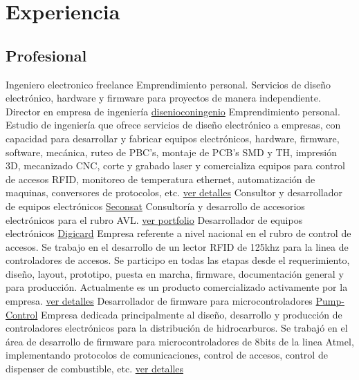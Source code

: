 \section{Experiencia}
   \subsection{Profesional}
       { Ingeniero electronico freelance}                   { } { } { } { Emprendimiento personal. Servicios de diseño electrónico, hardware y firmware para proyectos de manera independiente. }
           { Director en empresa de ingeniería}                 { \href { www.disenioconingenio.com.ar} { disenioconingenio}} { } { } { Emprendimiento personal. Estudio de ingeniería que ofrece servicios de diseño electrónico a empresas, con capacidad para desarrollar y fabricar equipos electrónicos, hardware, firmware, software, mecánica, ruteo de PBC's, montaje de PCB's SMD y TH, impresión 3D, mecanizado CNC, corte y grabado laser y comercializa equipos para control de accesos RFID, monitoreo de temperatura ethernet, automatización de maquinas, conversores de protocolos, etc. \href { http://disenioconingenio.com.ar/producto.php?products_id=398} { ver detalles}}
           { Consultor y desarrollador de equipos electrónicos} { \href { www.seconsat.com}             { Seconsat}}          { } { } { Consultoría y desarrollo de accesorios electrónicos para el rubro AVL. \hyperlink{subsec:seconsat}{ver portfolio}}
           { Desarrollador de equipos electrónicos}             { \href { www.digicard.com.ar}          { Digicard}}          { } { } { Empresa referente a nivel nacional en el rubro de control de accesos. Se trabajo en el desarrollo de un lector RFID de 125khz para la linea de controladores de accesos. Se participo en todas las etapas desde el requerimiento, diseño, layout, prototipo, puesta en marcha, firmware, documentación general y para producción. Actualmente es un producto comercializado activamente por la empresa. \href                                                          { http://disenioconingenio.com.ar/producto.php?products_id=393} { ver detalles}}
           { Desarrollador de firmware para microcontroladores} { \href { www.pump-control.com.ar}      { Pump-Control}}      { } { } { Empresa dedicada principalmente al diseño, desarrollo y producción de controladores electrónicos para la distribución de hidrocarburos. Se trabajó en el área de desarrollo de firmware para microcontroladores de 8bits de la linea Atmel, implementando protocolos de comunicaciones, control de accesos, control de dispenser de combustible, etc. \href                                                                                                            { http://disenioconingenio.com.ar/producto.php?products_id=391} { ver detalles}}

